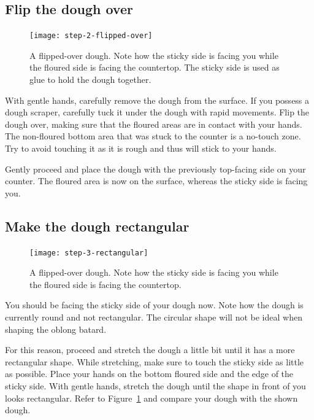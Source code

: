 \subsection[Flipping the dough]{Flip the dough over}

\begin{figure}[!htb]
  \texttt{[image: step-2-flipped-over]}
  \caption[Step 2 of shaping process]{A flipped-over dough. Note how the
      sticky side is facing you while the floured side is facing the
      countertop.  The sticky side is used as glue to hold the dough together.}
\end{figure}

With gentle hands, carefully remove the dough from the surface. If
you possess a dough scraper, carefully tuck it under the dough with
rapid movements. Flip the dough over, making sure that the floured
areas are in contact with your hands. The non-floured bottom area that was
stuck to the counter is a no-touch zone. Try to avoid touching it
as it is rough and thus will stick to your hands.

Gently proceed and place the dough with the previously top-facing side
on your counter. The floured area is now on the surface, whereas the
sticky side is facing you.

\subsection[Create rectangular shape]{Make the dough rectangular}

\begin{figure}[htb!]
  \texttt{[image: step-3-rectangular]}
  \caption[Step 3 of shaping process]{A flipped-over dough. Note how the
      sticky side is facing you while the floured side is facing the
      countertop.}%
  \label{fig:shaping-rectangular-dough}
\end{figure}

You should be facing the sticky side of your dough now. Note how
the dough is currently round and not rectangular. The circular
shape will not be ideal when shaping the oblong batard.

For this reason, proceed and stretch the dough a little bit until
it has a more rectangular shape. While stretching, make sure to touch
the sticky side as little as possible. Place your hands on the bottom
floured side and the edge of the sticky side. With gentle hands,
stretch the dough until the shape in front of you looks rectangular.
Refer to Figure~\ref{fig:shaping-rectangular-dough} and compare
your dough with the shown dough.

